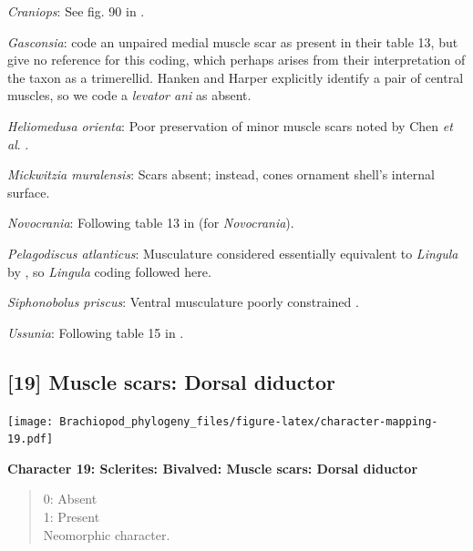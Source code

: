 \documentclass[openany]{book}
\theoremstyle{definition}
\theoremstyle{definition}
\theoremstyle{definition}
\theoremstyle{remark}
\begin{document}
\hypertarget{Craniops-coding-18}{}
\emph{Craniops}: See fig. 90 in
\citet{Williams2000LinguliformeaCraniiformea}.

\hypertarget{Gasconsia-coding-18}{}
\emph{Gasconsia}: \citet{Williams2000LinguliformeaCraniiformea} code an
unpaired medial muscle scar as present in their table 13, but give no
reference for this coding, which perhaps arises from their
interpretation of the taxon as a trimerellid. Hanken and Harper
\citeyearpar[p.~249 and text-fig. 2]{Hanken1985Thetaxonomy} explicitly
identify a pair of central muscles, so we code a \emph{levator ani} as
absent.

\hypertarget{Heliomedusa_orienta-coding-18}{}
\emph{Heliomedusa orienta}: Poor preservation of minor muscle scars
noted by Chen \emph{et al}. \citeyearpar{Chen2007Reinterpretationof}.

\hypertarget{Mickwitzia_muralensis-coding-18}{}
\emph{Mickwitzia muralensis}: Scars absent; instead, cones ornament
shell's internal surface.

\hypertarget{Novocrania-coding-18}{}
\emph{Novocrania}: Following table 13 in
\citet{Williams2000LinguliformeaCraniiformea} (for \emph{Novocrania}).

\hypertarget{Pelagodiscus_atlanticus-coding-18}{}
\emph{Pelagodiscus atlanticus}: Musculature considered essentially
equivalent to \emph{Lingula} by
\citet{Williams2000LinguliformeaCraniiformea}, so \emph{Lingula} coding
followed here.

\hypertarget{Siphonobolus_priscus-coding-18}{}
\emph{Siphonobolus priscus}: Ventral musculature poorly constrained
\citep{Williams2000LinguliformeaCraniiformea, Popov2009Earlyontogeny}.

\hypertarget{Ussunia-coding-18}{}
\emph{Ussunia}: Following table 15 in
\citet{Williams2000LinguliformeaCraniiformea}.

\subsection*{{[}19{]} Muscle scars: Dorsal
diductor}\label{muscle-scars-dorsal-diductor}

\texttt{[image: Brachiopod\_phylogeny\_files/figure-latex/character-mapping-19.pdf]}

\textbf{Character 19: Sclerites: Bivalved: Muscle scars: Dorsal
diductor}

\begin{quote}
0: Absent\\
1: Present\\
Neomorphic character.
\end{quote}
\end{document}

